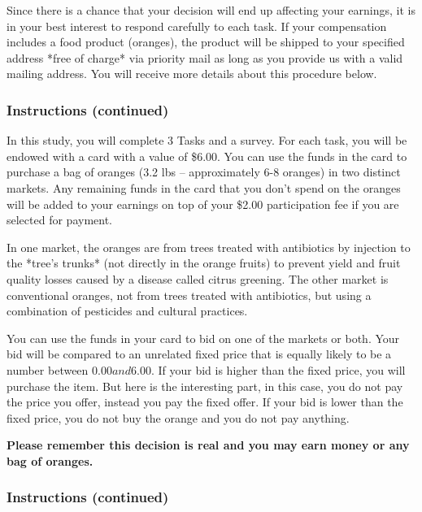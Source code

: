 \documentclass[12pt]{article}
\begin{document}
 Since there is a chance that your decision will end up affecting your earnings, it is in your best interest to respond carefully to each task. If your compensation includes a food product (oranges), the product will be shipped to your specified address *free of charge* via priority mail as long as you provide us with a valid mailing address. You will receive more details about this procedure below.

\clearpage

\subsubsection*{\textbf{Instructions (continued)}}

In this study, you will complete 3 Tasks and a survey.
For each task, you will be endowed with a card with a value of \$6.00. You can use the funds in the card to purchase a bag of oranges (3.2 lbs – approximately 6-8 oranges) in two distinct markets. Any remaining funds in the card that you don’t spend on the oranges will be added to your earnings on top of your \$2.00 participation fee if you are selected for payment.



In one market, the oranges are from trees treated with antibiotics by injection to the *tree’s trunks* (not directly in the orange fruits) to prevent yield and fruit quality losses caused by a disease called citrus greening. The other market is conventional oranges, not from trees treated with antibiotics, but using a combination of pesticides and cultural practices.


You can use the funds in your card to bid on one of the markets or both. Your bid will be compared to an unrelated fixed price that is equally likely to be a number between $0.00 and $6.00. If your bid is higher than the fixed price, you will purchase the item. But here is the interesting part, in this case, you do not pay the price you offer, instead you pay the fixed offer. If your bid is lower than the fixed price, you do not buy the orange and you do not pay anything. 

 

\textbf{Please remember this decision is real and you may earn money or any bag of oranges.}

 

 \clearpage

\subsubsection*{\textbf{Instructions (continued)}}
\end{document}
